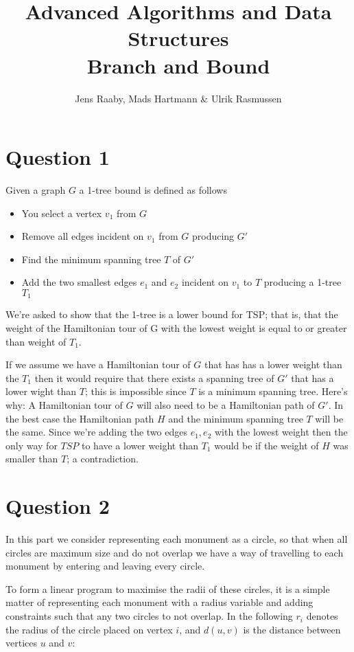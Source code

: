 \documentclass[a4paper, 10pt, oneside, article]{memoir}
\title{Advanced Algorithms and Data Structures\\ Branch and Bound}
\author{Jens Raaby, Mads Hartmann \& Ulrik Rasmussen}
\begin{document}
\maketitle

\section*{Question 1}


Given a graph $G$ a 1-tree bound is defined as follows

\begin{itemize}
  \item You select a vertex $v_1$ from $G$
  \item Remove all edges incident on $v_1$ from $G$ producing $G'$
  \item Find the minimum spanning tree $T$ of $G'$
  \item Add the two smallest edges $e_1$ and $e_2$ incident on $v_1$
    to $T$ producing a 1-tree $T_1$
\end{itemize}

We're asked to show that the 1-tree is a lower bound for TSP; that is,
that the weight of the Hamiltonian tour of G with the lowest weight is
equal to or greater than weight of $T_1$.

If we assume we have a Hamiltonian tour of $G$ that has has a lower
weight than the $T_1$ then it would require that there exists a
spanning tree of $G'$ that has a lower wight than $T$; this is
impossible since $T$ is a minimum spanning tree. Here's why: A
Hamiltonian tour of $G$ will also need to be a Hamiltonian path of
$G'$. In the best case the Hamiltonian path $H$ and the minimum
spanning tree $T$ will be the same. Since we're adding the two edges
$e_1, e_2$ with the lowest weight then the only way for $TSP$ to have
a lower weight than $T_1$ would be if the weight of $H$ was smaller
than $T$; a contradiction.


\section*{Question 2}
In this part we consider representing each monument as a circle, so
that when all circles are maximum size and do not overlap we have a
way of travelling to each monument by entering and leaving every
circle.

To form a linear program to maximise the radii of these circles, it is
a simple matter of representing each monument with a radius variable
and adding constraints such that any two circles to not overlap. In
the following $r_i$ denotes the radius of the circle placed on vertex
$i$, and $d(u,v)$ is the distance between vertices $u$ and $v$:
\end{document}
